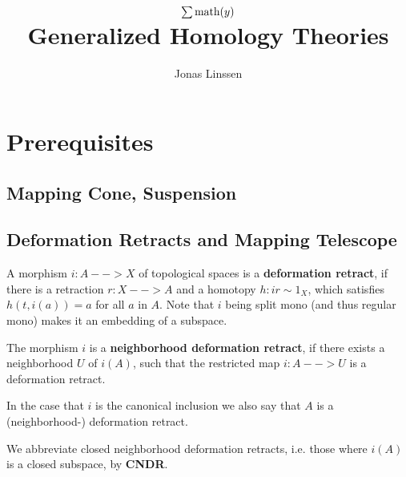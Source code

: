 

\title{$\sum\text{math}(y)$\\Generalized Homology Theories}
\author{Jonas Linssen}


	\maketitle
	\tableofcontents

	\newpage
	\setcounter{section}{-1}
	\section{Prerequisites}
	\subsection{Mapping Cone, Suspension}
	\subsection{Deformation Retracts and Mapping Telescope}

	\begin{definition}
		A morphism $i:A --> X$ of topological spaces is a \textbf{deformation retract}, if there is a retraction $r:X --> A$ and a homotopy $h:ir \sim 1_X$, which satisfies $h(t,i(a)) = a$ for all $a$ in $A$. Note that $i$ being split mono (and thus regular mono) makes it an embedding of a subspace.

		The morphism $i$ is a \textbf{neighborhood deformation retract}, if there exists a neighborhood $U$ of $i(A)$, such that the restricted map $i:A-->U$ is a deformation retract.

		In the case that $i$ is the canonical inclusion we also say that $A$ is a (neighborhood-) deformation retract.

		We abbreviate closed neighborhood deformation retracts, i.e. those where $i(A)$ is a closed subspace, by \textbf{CNDR}.
	\end{definition}


